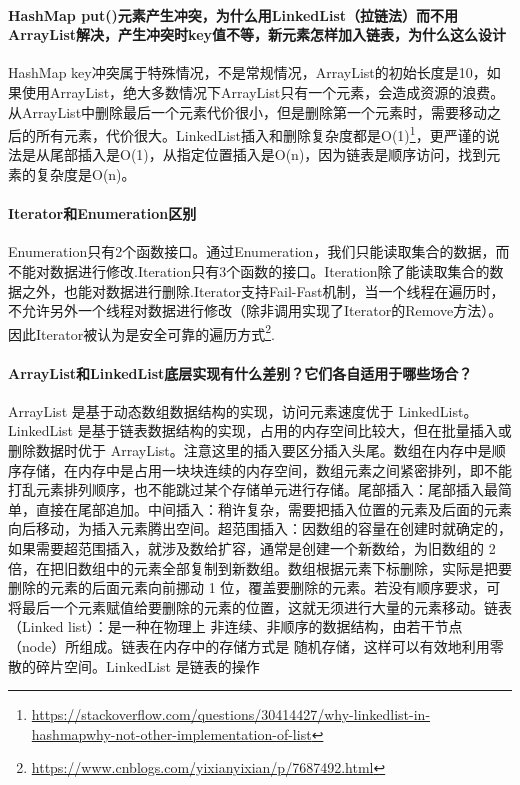 \documentclass[../../../interview-questions.tex]{subfiles}
\begin{document}
\paragraph{HashMap put()元素产生冲突，为什么用LinkedList（拉链法）而不用ArrayList解决，产生冲突时key值不等，新元素怎样加入链表，为什么这么设计}

HashMap key冲突属于特殊情况，不是常规情况，ArrayList的初始长度是10，如果使用ArrayList，绝大多数情况下ArrayList只有一个元素，会造成资源的浪费。从ArrayList中删除最后一个元素代价很小，但是删除第一个元素时，需要移动之后的所有元素，代价很大。LinkedList插入和删除复杂度都是O(1)\footnote{\url{https://stackoverflow.com/questions/30414427/why-linkedlist-in-hashmapwhy-not-other-implementation-of-list}}，更严谨的说法是从尾部插入是O(1)，从指定位置插入是O(n)，因为链表是顺序访问，找到元素的复杂度是O(n)。

\paragraph{Iterator和Enumeration区别}

Enumeration只有2个函数接口。通过Enumeration，我们只能读取集合的数据，而不能对数据进行修改.Iteration只有3个函数的接口。Iteration除了能读取集合的数据之外，也能对数据进行删除.Iterator支持Fail-Fast机制，当一个线程在遍历时，不允许另外一个线程对数据进行修改（除非调用实现了Iterator的Remove方法）。因此Iterator被认为是安全可靠的遍历方式\footnote{\url{https://www.cnblogs.com/yixianyixian/p/7687492.html}}.


\paragraph{ArrayList和LinkedList底层实现有什么差别？它们各自适用于哪些场合？}

ArrayList 是基于动态数组数据结构的实现，访问元素速度优于 LinkedList。LinkedList 是基于链表数据结构的实现，占用的内存空间比较大，但在批量插入或删除数据时优于 ArrayList。注意这里的插入要区分插入头尾。数组在内存中是顺序存储，在内存中是占用一块块连续的内存空间，数组元素之间紧密排列，即不能打乱元素排列顺序，也不能跳过某个存储单元进行存储。尾部插入：尾部插入最简单，直接在尾部追加。中间插入：稍许复杂，需要把插入位置的元素及后面的元素向后移动，为插入元素腾出空间。超范围插入：因数组的容量在创建时就确定的，如果需要超范围插入，就涉及数给扩容，通常是创建一个新数给，为旧数组的 2 倍，在把旧数组中的元素全部复制到新数组。数组根据元素下标删除，实际是把要删除的元素的后面元素向前挪动 1 位，覆盖要删除的元素。若没有顺序要求，可将最后一个元素赋值给要删除的元素的位置，这就无须进行大量的元素移动。链表（Linked list）：是一种在物理上 非连续、非顺序的数据结构，由若干节点（node）所组成。链表在内存中的存储方式是 随机存储，这样可以有效地利用零散的碎片空间。LinkedList 是链表的操作
\end{document}
